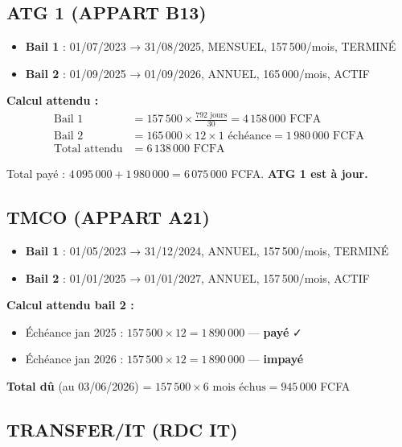 \documentclass[a4paper,11pt]{article}
\begin{document}
\subsection{ATG 1 (APPART B13)}

\begin{itemize}
  \item \textbf{Bail 1} : 01/07/2023 → 31/08/2025, MENSUEL, 157\,500/mois, TERMINÉ
  \item \textbf{Bail 2} : 01/09/2025 → 01/09/2026, ANNUEL, 165\,000/mois, ACTIF
\end{itemize}

\textbf{Calcul attendu :}
\begin{align*}
\text{Bail 1} &= 157\,500 \times \frac{792 \text{ jours}}{30} = 4\,158\,000 \text{ FCFA} \\
\text{Bail 2} &= 165\,000 \times 12 \times 1 \text{ échéance} = 1\,980\,000 \text{ FCFA} \\
\text{Total attendu} &= 6\,138\,000 \text{ FCFA}
\end{align*}

Total payé : $4\,095\,000 + 1\,980\,000 = 6\,075\,000$ FCFA. \textbf{ATG 1 est à jour.}

\subsection{TMCO (APPART A21)}

\begin{itemize}
  \item \textbf{Bail 1} : 01/05/2023 → 31/12/2024, ANNUEL, 157\,500/mois, TERMINÉ
  \item \textbf{Bail 2} : 01/01/2025 → 01/01/2027, ANNUEL, 157\,500/mois, ACTIF
\end{itemize}

\textbf{Calcul attendu bail 2 :}
\begin{itemize}
  \item Échéance jan 2025 : $157\,500 \times 12 = 1\,890\,000$ — \textbf{payé} ✓
  \item Échéance jan 2026 : $157\,500 \times 12 = 1\,890\,000$ — \textbf{impayé}
\end{itemize}

\textbf{Total dû} (au 03/06/2026) = $157\,500 \times 6 \text{ mois échus} = 945\,000$ FCFA

\subsection{TRANSFER/IT (RDC IT)}
\end{document}
